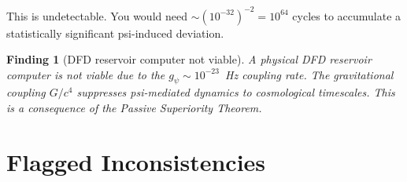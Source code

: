 \documentclass[11pt]{article}
\newtheorem{finding}[theorem]{Finding}
\theoremstyle{definition}
\theoremstyle{remark}
\begin{document}
This is undetectable.  You would need $\sim (10^{-32})^{-2} = 10^{64}$ cycles
to accumulate a statistically significant psi-induced deviation.

\begin{finding}[DFD reservoir computer not viable]
  \label{find:reservoir-dead}
  A physical DFD reservoir computer is not viable due to the $g_\psi \sim
  10^{-23}$~Hz coupling rate.  The gravitational coupling $G/c^4$ suppresses
  psi-mediated dynamics to cosmological timescales.  This is a consequence
  of the Passive Superiority Theorem.
\end{finding}

\section{Flagged Inconsistencies}
\label{sec:inconsistencies}
\end{document}
